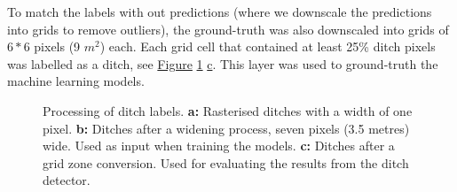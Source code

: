 \documentclass[]{interact}
\theoremstyle{plain}%
\theoremstyle{definition}
\theoremstyle{remark}
\begin{document}
To match the labels with out predictions (where we downscale the predictions into grids to remove outliers), the ground-truth was also downscaled into grids of $6*6$ pixels (9 $m^2$) each. Each grid cell that contained at least 25\% ditch pixels was labelled as a ditch, see \hyperref[fig:ditchpreprocess]{Figure} \ref{fig:ditchpreprocess} \hyperref[fig:ditchpreprocess]{c}. This layer was used to ground-truth the machine learning models.

\begin{figure} [htb!]
    \centering
    \hspace{5pt}
    \caption{Processing of ditch labels. \textbf{a: }Rasterised ditches with a width of one pixel. \textbf{b: }Ditches after a widening process, seven pixels (3.5 metres) wide. Used as input when training the models. \textbf{c: }Ditches after a grid zone conversion. Used for evaluating the results from the ditch detector.} \label{sample-figure}
    \label{fig:ditchpreprocess}
\end{figure}
\end{document}
